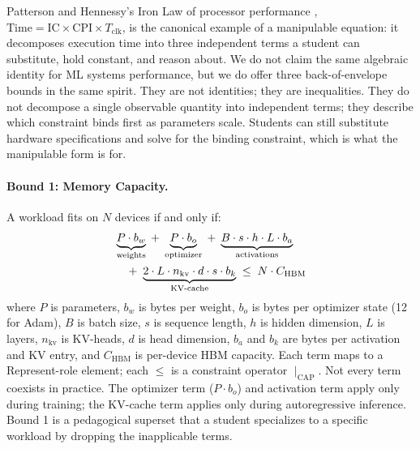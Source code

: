 \documentclass[10pt,twocolumn]{article}
\begin{document}
Patterson and Hennessy's Iron Law of processor performance \citep{hennessy2019architecture}, $\text{Time} = \text{IC} \times \text{CPI} \times T_{\text{clk}}$, is the canonical example of a manipulable equation: it decomposes execution time into three independent terms a student can substitute, hold constant, and reason about. We do not claim the same algebraic identity for ML systems performance, but we do offer three back-of-envelope bounds in the same spirit. They are not identities; they are inequalities. They do not decompose a single observable quantity into independent terms; they describe which constraint binds first as parameters scale. Students can still substitute hardware specifications and solve for the binding constraint, which is what the manipulable form is for.

\paragraph{Bound 1: Memory Capacity.} A workload fits on $N$ devices if and only if:
\begin{align}
\label{eq:iron-capacity}
&\underbrace{P \cdot b_w}_{\text{weights}} \;+\; \underbrace{P \cdot b_o}_{\text{optimizer}} \;+\; \underbrace{B \cdot s \cdot h \cdot L \cdot b_a}_{\text{activations}} \notag \\
&\quad +\; \underbrace{2 \cdot L \cdot n_{\text{kv}} \cdot d \cdot s \cdot b_k}_{\text{KV-cache}} \;\leq\; N \cdot C_{\text{HBM}}
\end{align}
where $P$ is parameters, $b_w$ is bytes per weight, $b_o$ is bytes per optimizer state (12 for Adam), $B$ is batch size, $s$ is sequence length, $h$ is hidden dimension, $L$ is layers, $n_{\text{kv}}$ is KV-heads, $d$ is head dimension, $b_a$ and $b_k$ are bytes per activation and KV entry, and $C_{\text{HBM}}$ is per-device HBM capacity. Each term maps to a Represent-role element; each $\leq$ is a constraint operator $\mid_{\text{CAP}}$. Not every term coexists in practice. The optimizer term ($P \cdot b_o$) and activation term apply only during training; the KV-cache term applies only during autoregressive inference. Bound 1 is a pedagogical superset that a student specializes to a specific workload by dropping the inapplicable terms.
\end{document}

